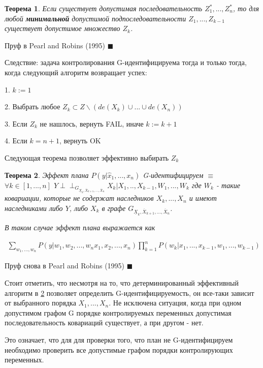\documentclass[fleqn]{article}
\newcommand{\independent}{\perp \!\!\! \perp}
\newtheorem{theorem}{Теорема}
\numberwithin{equation}{section}
\numberwithin{theorem}{section}
\numberwithin{figure}{section}
\numberwithin{lemma}{section}
\numberwithin{corollary}{section}
\begin{document}
\begin{theorem}
	Если существует допустимая последовательность $Z_1^*,...,Z_n^*$,  то для любой \textbf{минимальной} допустимой подпоследовательности  $Z_1,...,Z_{k-1}$ существует допустимое множество $Z_k$.
\end{theorem}
 
 Пруф в Pearl and Robins (1995) $\blacksquare$
 
Следствие: задача контролирования G-идентифицируема тогда и только тогда, когда следующий алгоритм возвращает успех:

1. $k := 1$

2. Выбрать любое $Z_k \subset Z \backslash (de(X_k) \cup ... \cup de(X_n))$ 

3. Если $Z_k$ не нашлось, вернуть FAIL, иначе $k := k + 1$

4. Если $k = n + 1$, вернуть OK

Следующая теорема позволяет эффективно выбирать $Z_k$

\begin{theorem}
	\label{th:plan_identification}
	Эффект плана $P(y|\hat x_1,...,x_n)$ G-идентифицируем $\equiv$ $\forall k \in [1,...,n]$ $Y \independent_{G_{\underline{X}_k,\overline{X}_{k+1},...,\overline{X}_n}}X_k | X_1,..,X_{k-1},W_1,...,W_k$ где $W_k$ - такие ковариации, которые не содержат наследников $X_k,...,X_n$ и имеют наследниками либо $Y$, либо $X_k$ в графе  $G_{\underline{X}_k,\overline{X}_{k+1},...,\overline{X}_n}$. 
	
	В таком случае эффект плана выражается как 
	
	\begin{align}
		\sum\limits_{w_1,...,w_n}P(y|w_1, w_2,...,w_n x_1, x_2,...,x_n)\prod\limits_{k=1}^nP(w_k|x_1,...,x_{k-1},w_1,...,w_{k-1})
	\end{align}
\end{theorem}
 
 Пруф снова в Pearl and Robins (1995) $\blacksquare$
 
 
 Стоит отметить, что несмотря на то, что детерминированный эффективный алгоритм в \ref{th:plan_identification} позволяет определить G-идентифицируемость, он все-таки зависит от выбранного порядка $X_1,...,X_n$. Не исключена ситуация, когда при одном допустимом графом G порядке контролируемых переменных допустимая последовательность ковариаций существует, а при другом - нет.
 
 Это означает, что для для проверки того, что план не G-идентифицируем необходимо проверить все допустимые графом порядки контролирующих переменных.
 
\end{document}
